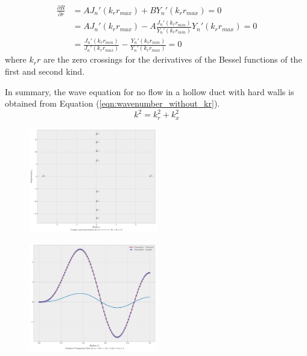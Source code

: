 \begin{frame}
\begin{align*} 
    \frac{ \partial R}{\partial r} &= AJ_n'(k_r r_{max}) + B Y_n' (k_r r_{max}) = 0 \\
                                   &= AJ_n'(k_r r_{max}) - A\frac{J_n' (k_r r_{min})}{Y_n'(k_r r_{min})} Y_n' (k_r r_{max}) = 0 \\
                                   &= \frac{J_n'(k_r r_{min})}{J_n' (k_r r_{max})} - \frac{Y_n'(k_r r_{min})}{Y_n' (k_r r_{max})} = 0 
\end{align*}
where $k_r r$ are the zero crossings for the derivatives of the Bessel functions of the first and second kind.

In summary, the wave equation for no flow in a hollow duct with hard walls is obtained 
from Equation (\ref{eqn:wavenumber_without_kr}).
\begin{equation}
    k^2 = k_r^2 + k_x^2
    \label{eqn:wavenumber_equation}
\end{equation}

\end{frame}
\begin{frame}
    \begin{figure}[!]
        \centering
        \includegraphics[width=0.5\textwidth]{axial_wavenumber_analytical_test_case.pdf}
    \end{figure}
\end{frame}
\begin{frame}
    \begin{figure}[!]
        \centering
        \includegraphics[width=0.5\textwidth]{Radial_mode_analytical_test_case.pdf}
    \end{figure}
\end{frame}
